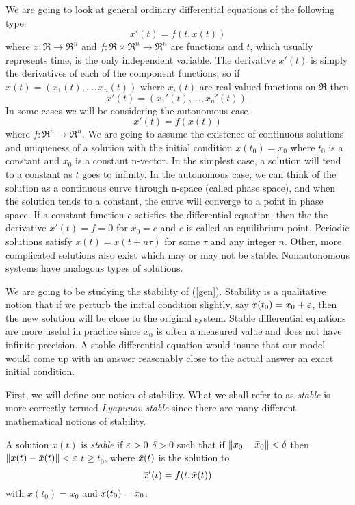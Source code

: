 \documentclass[nols]{tufte-handout}
\theoremstyle{definition}
\begin{document}
We are going to look at general ordinary differential equations of the
following type:
\begin{equation}
	x'(t) = f(t,x(t))
	\label{gen}
\end{equation}
where $x: \Re \rightarrow \Re^n$ and $f:\Re \times \Re^n \rightarrow
\Re^n$ are functions and $t$, which usually represents time, is the
only independent variable.  The derivative $x'(t)$ is simply the
derivatives of each of the component functions, so if $x(t) =
(x_1(t),...,x_n(t))$ where $x_i(t)$ are real-valued functions on $\Re$
then
$$x'(t) = (x_1'(t),...,x_n'(t)).$$
In some cases we will be considering the autonomous case
\begin{equation}
	x'(t) = f(x(t))
	\label{aut}
\end{equation}
where $f:\Re^n \rightarrow \Re^n$.  We are going to assume the
existence of continuous solutions and uniqueness of a solution with
the initial condition $x(t_0) = x_0$ where $t_0$ is a constant and
$x_0$ is a constant n-vector.  In the simplest case, a solution will
tend to a constant as $t$ goes to infinity.  In the autonomous case,
we can think of the solution as a continuous curve through n-space
(called phase space), and when the solution tends to a constant, the
curve will converge to a point in phase space.  If a constant function
$c$ satisfies the differential equation, then the the derivative
$x'(t) = f = 0$ for $x_0 = c$ and $c$ is called an equilibrium point.
Periodic solutions satisfy $x(t) = x(t + n\tau)$ for some $\tau$ and
any integer $n$.  Other, more complicated solutions also exist which
may or may not be stable.  Nonautonomous systems have analogous types
of solutions.

We are going to be studying the stability of (\ref{gen}).  Stability
is a qualitative notion that if we perturb the initial condition
slightly, say $x(t_0) = x_0 + \varepsilon$, then the new solution will be
close to the original system.  Stable differential equations are more
useful in practice since $x_0$ is often a  measured value and does
not have infinite precision.  A stable differential equation would
insure that our model would come up with an answer reasonably close to
the actual answer an exact initial condition.

First, we will define our notion of stability.  What we shall refer to
as {\em stable} is more correctly termed {\em Lyapunov stable} since
there are many different mathematical notions of stability.

\begin{dfn}
  	A solution $x(t)$ is {\em stable} if \a $\varepsilon >0$
	\e $\delta > 0$ such that if $\| x_0 - \bar{x}_0 \| < \delta$ then
	$\| x(t) - \bar{x}(t) \| < \varepsilon$ \a $t \ge t_0$, where $\bar{x}(t)$ is
	the solution to
	$$\bar{x}'(t) = f(t, \bar{x}(t))$$
with $x(t_0) = x_0$ and $\bar{x}(t_0) = \bar{x}_0$.
\end{dfn}
\end{document}
